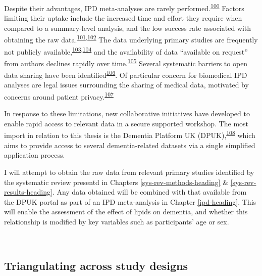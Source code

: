 \documentclass[a4paper, twoside]{templates/ociamthesis}
\begin{document}
Despite their advantages, IPD meta-analyses are rarely performed.\textsuperscript{\protect\hyperlink{ref-tugwell2010}{100}} Factors limiting their uptake include the increased time and effort they require when compared to a summary-level analysis, and the low success rate associated with obtaining the raw data.\textsuperscript{\protect\hyperlink{ref-nevitt2017}{101},\protect\hyperlink{ref-ventresca2020}{102}} The data underlying primary studies are frequently not publicly available,\textsuperscript{\protect\hyperlink{ref-alsheikh-ali2011}{103},\protect\hyperlink{ref-federer2018}{104}} and the availability of data ``available on request'' from authors declines rapidly over time.\textsuperscript{\protect\hyperlink{ref-vines2014}{105}} Several systematic barriers to open data sharing have been identified\textsuperscript{\protect\hyperlink{ref-vanpanhuis2014}{106}}. Of particular concern for biomedical IPD analyses are legal issues surrounding the sharing of medical data, motivated by concerns around patient privacy.\textsuperscript{\protect\hyperlink{ref-wartenberg2010}{107}}

In response to these limitations, new collaborative initiatives have developed to enable rapid access to relevant data in a secure supported workshop. The most import in relation to this thesis is the Dementia Platform UK (DPUK),\textsuperscript{\protect\hyperlink{ref-bauermeister2020}{108}} which aims to provide access to several dementia-related datasets via a single simplified application process.

I will attempt to obtain the raw data from relevant primary studies identified by the systematic review presentd in Chapters \ref{sys-rev-methods-heading} \& \ref{sys-rev-results-heading}. Any data obtained will be combined with that available from the DPUK portal as part of an IPD meta-analysis in Chapter \ref{ipd-heading}. This will enable the assessment of the effect of lipids on dementia, and whether this relationship is modified by key variables such as participants' age or sex.

~

\hypertarget{intro-triangulation}{%
\subsection{Triangulating across study designs}\label{intro-triangulation}}
\end{document}
